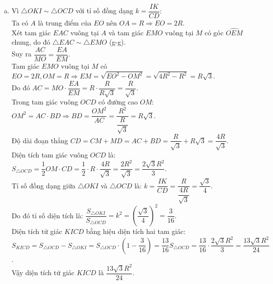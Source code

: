 \begin{bt}
{\begin{enumerate}[a)]
    $OI \cdot OC = OM^2 = OK \cdot OD \Rightarrow \dfrac{OI}{OD} = \dfrac{OK}{OC}$.\\
    Xét $\triangle OKI$ và $\triangle OCD$ có:
    $\left\{\begin{aligned} &\widehat{COD}\text{ là góc chung} \\ &\dfrac{OI}{OD} = \dfrac{OK}{OC}\text{ (chứng minh trên)}. \end{aligned}\right.$\\
    Do đó $\triangle OKI \sim \triangle OCD$ (c-g-c).
    \item Vì $\triangle OKI \sim \triangle OCD$ với tỉ số đồng dạng $k = \dfrac{IK}{CD}$:\\
    Ta có $A$ là trung điểm của $EO$ nên $OA = R \Rightarrow EO = 2R$.\\
    Xét tam giác $EAC$ vuông tại $A$ và tam giác $EMO$ vuông tại $M$ có góc $\widehat{OEM}$ chung, do đó $\triangle EAC \sim \triangle EMO$ (g-g).\\
    Suy ra $\dfrac{AC}{MO} = \dfrac{EA}{EM}$.\\
    Tam giác $EMO$ vuông tại $M$ có $EO = 2R, OM = R \Rightarrow EM = \sqrt{EO^2 - OM^2} = \sqrt{4R^2 - R^2} = R\sqrt{3}$.\\
    Do đó $AC = MO \cdot \dfrac{EA}{EM} = R \cdot \dfrac{R}{R\sqrt{3}} = \dfrac{R}{\sqrt{3}}$.\\
    Trong tam giác vuông $OCD$ có đường cao $OM$:
    $OM^2 = AC \cdot BD \Rightarrow BD = \dfrac{OM^2}{AC} = \dfrac{R^2}{\dfrac{R}{\sqrt{3}}} = R\sqrt{3}$.\\
    Độ dài đoạn thẳng $CD = CM + MD = AC + BD = \dfrac{R}{\sqrt{3}} + R\sqrt{3} = \dfrac{4R}{\sqrt{3}}$.\\
    Diện tích tam giác vuông $OCD$ là:
    $S_{\triangle OCD} = \dfrac{1}{2} OM \cdot CD = \dfrac{1}{2} \cdot R \cdot \dfrac{4R}{\sqrt{3}} = \dfrac{2R^2}{\sqrt{3}} = \dfrac{2\sqrt{3}R^2}{3}$.\\
    Tỉ số đồng dạng giữa $\triangle OKI$ và $\triangle OCD$ là:
    $k = \dfrac{IK}{CD} = \dfrac{R}{\dfrac{4R}{\sqrt{3}}} = \dfrac{\sqrt{3}}{4}$.\\
    Do đó tỉ số diện tích là:
    $\dfrac{S_{\triangle OKI}}{S_{\triangle OCD}} = k^2 = \left(\dfrac{\sqrt{3}}{4}\right)^2 = \dfrac{3}{16}$.\\
    Diện tích tứ giác $KICD$ bằng hiệu diện tích hai tam giác:
    $S_{KICD} = S_{\triangle OCD} - S_{\triangle OKI} = S_{\triangle OCD} \cdot \left(1 - \dfrac{3}{16}\right) = \dfrac{13}{16} S_{\triangle OCD} = \dfrac{13}{16} \cdot \dfrac{2\sqrt{3}R^2}{3} = \dfrac{13\sqrt{3}R^2}{24}$.\\
    Vậy diện tích tứ giác $KICD$ là $\dfrac{13\sqrt{3}R^2}{24}$.
\end{enumerate}
}
\end{bt}

